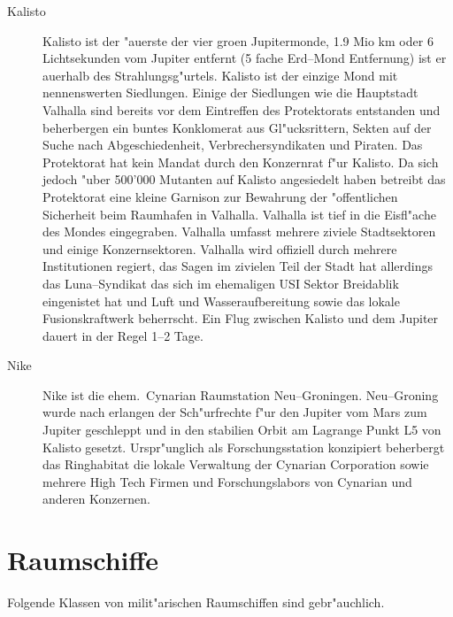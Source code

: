 \begin{appendices}
\begin{description}
\item [Kalisto] Kalisto ist der "au\3erste der vier gro\3en Jupitermonde, 1.9 Mio km oder 6 Lichtsekunden vom Jupiter
      entfernt (5 fache Erd--Mond Entfernung) ist er au\3erhalb des Strahlungsg"urtels. Kalisto ist der einzige Mond mit nennenswerten Siedlungen. Einige der Siedlungen wie die Hauptstadt Valhalla sind bereits vor dem Eintreffen des Protektorats entstanden und beherbergen ein buntes Konklomerat aus Gl"ucksrittern, Sekten auf der Suche nach Abgeschiedenheit, Verbrechersyndikaten und Piraten. Das Protektorat hat kein Mandat durch den Konzernrat f"ur Kalisto. Da sich jedoch "uber 500'000 Mutanten auf Kalisto angesiedelt haben betreibt das Protektorat eine kleine Garnison zur Bewahrung der "offentlichen Sicherheit beim Raumhafen in Valhalla. Valhalla ist tief in die Eisfl"ache des Mondes eingegraben. Valhalla umfasst mehrere ziviele Stadtsektoren und einige Konzernsektoren. Valhalla wird offiziell durch mehrere Institutionen regiert, das Sagen im zivielen Teil der Stadt hat allerdings das Luna--Syndikat das sich im ehemaligen USI Sektor Breidablik eingenistet hat und Luft und Wasseraufbereitung sowie das lokale Fusionskraftwerk beherrscht. Ein Flug zwischen Kalisto und dem Jupiter dauert in der Regel 1--2 Tage. %
\item [Nike] Nike ist die ehem.~Cynarian Raumstation Neu--Groningen. Neu--Groning wurde nach erlangen der Sch"urfrechte
      f"ur den Jupiter vom Mars zum Jupiter geschleppt und in den stabilien Orbit am Lagrange Punkt L5 von Kalisto gesetzt. Urspr"unglich als Forschungsstation konzipiert beherbergt das Ringhabitat die lokale Verwaltung der Cynarian Corporation sowie mehrere High Tech Firmen und Forschungslabors von Cynarian und anderen Konzernen.
\end{description}

\section{Raumschiffe}

Folgende Klassen von milit"arischen Raumschiffen sind gebr"auchlich.


\end{appendices}
